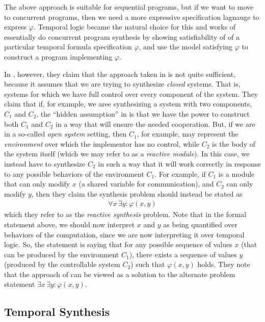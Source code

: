 \documentclass[10pt,a4paper]{article}
\begin{document}
The above approach is suitable for sequential programs, but if we want to move to concurrent programs, then we need a more expressive specification lagnauge to express $\varphi$. Temporal logic became the natural choice for this and works of \cite{1981clarkemerson, 1984mannawolper} essentially do concurrent program synthesis by showing satisfiability of of a particular temporal formula specification $\varphi$, and use the model satisfying $\varphi$ to construct a program implementing $\varphi$.

In \cite{1989pnuelirosner}, however, they claim that the approach taken in \cite{1981clarkemerson, 1984mannawolper} is not quite sufficient, because it assumes that we are trying to synthesize \textit{closed} systems. That is, systems for which we have full control over every component of the system. They claim that if, for example, we aree synthesizing a system with two components, $C_1$ and $C_2$, the ``hidden assumption'' in \cite{1981clarkemerson} is that we have the power to construct both $C_1$ and $C_2$ in a way that will ensure the needed cooperation. But, if we are in a so-called \textit{open system} setting, then $C_1$, for example, may represent the \textit{environment} over which the implementor has no control, while $C_2$ is the body of the system itself (which we may refer to as a \textit{reactive module}). In this case, we instead have to synthesize $C_2$ in such a way that it will work correctly in response to any possible behaviors of the environment $C_1$. For example, if $C_1$ is a module that can only modify $x$ (a shared variable for communication), and $C_2$ can only modify $y$, then they claim the synthesis problem should instead be stated as
\begin{align*}
    \forall x \, \exists y : \varphi(x,y)
\end{align*}
which they refer to as the \textit{reactive synthesis} problem. Note that in the formal statement above, we should now interpret $x$ and $y$ as being quantified over behaviors of the computation, since we are now interpreting it over temporal logic. So, the statement is saying that for any possible sequence of values $x$ (that can be produced by the environment $C_1$), there exists a sequence of values $y$ (produced by the controllable system $C_2$) such that $\varphi(x,y)$ holds. They note that the approach of \cite{1981clarkemerson} can be viewed as a solution to the alternate problem statement $\exists x \, \exists y : \varphi(x,y)$.

\subsection{Temporal Synthesis}
\end{document}

